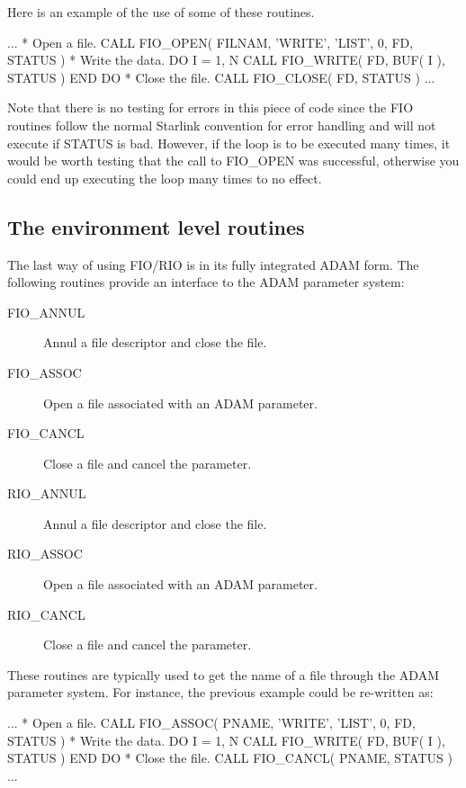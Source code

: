 \documentclass[twoside,11pt,nolof]{starlink}
\begin{document}
Here is an example of the use of some of these routines.

\begin{terminalv}
      ...
*  Open a file.
      CALL FIO_OPEN( FILNAM, 'WRITE', 'LIST', 0, FD, STATUS )
*  Write the data.
         DO I = 1, N
            CALL FIO_WRITE( FD, BUF( I ), STATUS )
         END DO
*  Close the file.
      CALL FIO_CLOSE( FD, STATUS )
      ...
\end{terminalv}

Note that there is no testing for errors in this piece of code since the FIO
routines follow the normal Starlink convention for error handling and will not
execute if STATUS is bad. However, if the loop is to be executed many times, it
would be worth testing that the call to FIO\_OPEN was successful, otherwise you
could end up executing the loop many times to no effect.

\subsection{The environment level routines}

The last way of using FIO/RIO is in its fully integrated ADAM form. The
following routines provide an interface to the ADAM parameter system:

\begin{description}
\item[FIO\_ANNUL] Annul a file descriptor and close the file.
\item[FIO\_ASSOC] Open a file associated with an ADAM parameter.
\item[FIO\_CANCL] Close a file and cancel the parameter.
\item[RIO\_ANNUL] Annul a file descriptor and close the file.
\item[RIO\_ASSOC] Open a file associated with an ADAM parameter.
\item[RIO\_CANCL] Close a file and cancel the parameter.
\end{description}

These routines are typically used to get the name of a file through the ADAM
parameter system. For instance, the previous example could be re-written as:

\begin{terminalv}
      ...
*  Open a file.
      CALL FIO_ASSOC( PNAME, 'WRITE', 'LIST', 0, FD, STATUS )
*  Write the data.
         DO I = 1, N
            CALL FIO_WRITE( FD, BUF( I ), STATUS )
         END DO
*  Close the file.
      CALL FIO_CANCL( PNAME, STATUS )
      ...
\end{terminalv}
\end{document}
